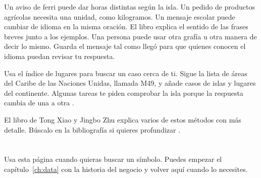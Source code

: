 {Un aviso de ferri puede dar horas distintas según la isla. Un pedido de productos agrícolas necesita una unidad, como kilogramos. Un mensaje escolar puede cambiar de idioma en la misma oración. El libro explica el sentido de las frases breves junto a los ejemplos. Una persona puede usar otra grafía u otra manera de decir lo mismo. Guarda el mensaje tal como llegó para que quienes conocen el idioma puedan revisar tu respuesta.}

{Usa el índice de lugares para buscar un caso cerca de ti. Sigue la lista de áreas del Caribe de las Naciones Unidas, llamada M49, y añade casos de islas y lugares del continente. Algunas tareas te piden comprobar la isla porque la respuesta cambia de una a otra \citep{m49,caricom,acs}.}

{El libro de Tong Xiao y Jingbo Zhu explica varios de estos métodos con más detalle. Búscalo en la bibliografía si quieres profundizar \citep{xiao}.}

\chapter{}
{Usa esta página cuando quieras buscar un símbolo. Puedes empezar el capítulo~\ref{ch:data} con la historia del negocio y volver aquí cuando lo necesites.}

